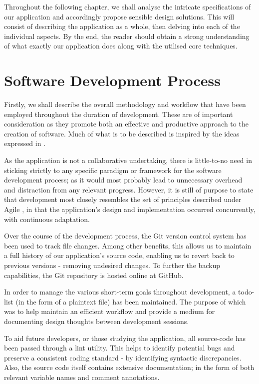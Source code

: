 \documentclass{standalone}
\begin{document}
	Throughout the following chapter, we shall analyse the intricate specifications of our application and accordingly propose sensible design solutions. This will consist of describing the application as a whole, then delving into each of the individual aspects. By the end, the reader should obtain a strong understanding of what exactly our application does along with the utilised core techniques.

	\section{Software Development Process}
		Firstly, we shall describe the overall methodology and workflow that have been employed throughout the duration of development. These are of important consideration as they promote both an effective and productive approach to the creation of software. Much of what is to be described is inspired by the ideas expressed in \parencite{pragmaticProgrammer}.

		As the application is not a collaborative undertaking, there is little-to-no need in sticking strictly to any specific paradigm or framework for the software development process; as it would most probably lead to unnecessary overhead and distraction from any relevant progress. However, it is still of purpose to state that development most closely resembles the set of principles described under Agile \parencite{beck2001agile}, in that the application's design and implementation occurred concurrently, with continuous adaptation.

		Over the course of the development process, the Git \parencite{gitWeb} version control system has been used to track file changes. Among other benefits, this allows us to maintain a full history of our application's source code, enabling us to revert back to previous versions - removing undesired changes. To further the backup capabilities, the Git repository is hosted online at GitHub\parencite{TronGitRepo}.

		In order to manage the various short-term goals throughout development, a todo-list (in the form of a plaintext file) has been maintained. The purpose of which was to help maintain an efficient workflow and provide a medium for documenting design thoughts between development sessions.

		To aid future developers, or those studying the application, all source-code has been passed through a lint utility. This helps to identify potential bugs and preserve a consistent coding standard - by identifying syntactic discrepancies. Also, the source code itself contains extensive documentation; in the form of both relevant variable names and comment annotations.
\end{document}
